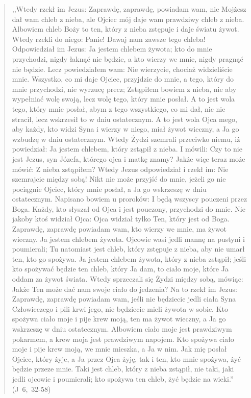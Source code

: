 \documentclass[10pt,a4paper,oneside]{article}
\begin{document}
\begin{quote}
,,Wtedy rzekł im Jezus: Zaprawdę, zaprawdę, powiadam wam, nie Mojżesz dał wam chleb z nieba, ale Ojciec mój daje wam prawdziwy chleb z nieba. Albowiem chleb Boży to ten, który z nieba zstępuje i daje światu żywot. Wtedy rzekli do niego: Panie! Dawaj nam zawsze tego chleba! Odpowiedział im Jezus: Ja jestem chlebem żywota; kto do mnie przychodzi, nigdy łaknąć nie będzie, a kto wierzy we mnie, nigdy pragnąć nie będzie. Lecz powiedziałem wam: Nie wierzycie, chociaż widzieliście mnie. Wszystko, co mi daje Ojciec, przyjdzie do mnie, a tego, który do mnie przychodzi, nie wyrzucę precz; Zstąpiłem bowiem z nieba, nie aby wypełniać wolę swoją, lecz wolę tego, który mnie posłał. A to jest wola tego, który mnie posłał, abym z tego wszystkiego, co mi dał, nic nie stracił, lecz wskrzesił to w dniu ostatecznym. A to jest wola Ojca mego, aby każdy, kto widzi Syna i wierzy w niego, miał żywot wieczny, a Ja go wzbudzę w dniu ostatecznym. Wtedy Żydzi szemrali przeciwko niemu, iż powiedział: Ja jestem chlebem, który zstąpił z nieba. I mówili: Czy to nie jest Jezus, syn Józefa, którego ojca i matkę znamy? Jakże więc teraz może mówić: Z nieba zstąpiłem? Wtedy Jezus odpowiedział i rzekł im: Nie szemrajcie między sobą! Nikt nie może przyjść do mnie, jeżeli go nie pociągnie Ojciec, który mnie posłał, a Ja go wskrzeszę w dniu ostatecznym. Napisano bowiem u proroków: I będą wszyscy pouczeni przez Boga. Każdy, kto słyszał od Ojca i jest pouczony, przychodzi do mnie. Nie jakoby ktoś widział Ojca: Ojca widział tylko Ten, który jest od Boga. Zaprawdę, zaprawdę powiadam wam, kto wierzy we mnie, ma żywot wieczny. Ja jestem chlebem żywota. Ojcowie wasi jedli mannę na pustyni i poumierali; Tu natomiast jest chleb, który zstępuje z nieba, aby nie umarł ten, kto go spożywa. Ja jestem chlebem żywota, który z nieba zstąpił; jeśli kto spożywać będzie ten chleb, który Ja dam, to ciało moje, które Ja oddam za żywot świata. Wtedy sprzeczali się Żydzi między sobą, mówiąc: Jakże Ten może dać nam swoje ciało do jedzenia? Na to rzekł im Jezus: Zaprawdę, zaprawdę powiadam wam, jeśli nie będziecie jedli ciała Syna Człowieczego i pili krwi jego, nie będziecie mieli żywota w sobie. Kto spożywa ciało moje i pije krew moją, ten ma żywot wieczny, a Ja go wskrzeszę w dniu ostatecznym. Albowiem ciało moje jest prawdziwym pokarmem, a krew moja jest prawdziwym napojem. Kto spożywa ciało moje i pije krew moją, we mnie mieszka, a Ja w nim. Jak mię posłał Ojciec, który żyje, a Ja przez Ojca żyję, tak i ten, kto mnie spożywa, żyć będzie przeze mnie. Taki jest chleb, który z nieba zstąpił, nie taki, jaki jedli ojcowie i poumierali; kto spożywa ten chleb, żyć będzie na wieki.'' \mbox{(J 6, 32-58)}
\end{quote}
\end{document}
